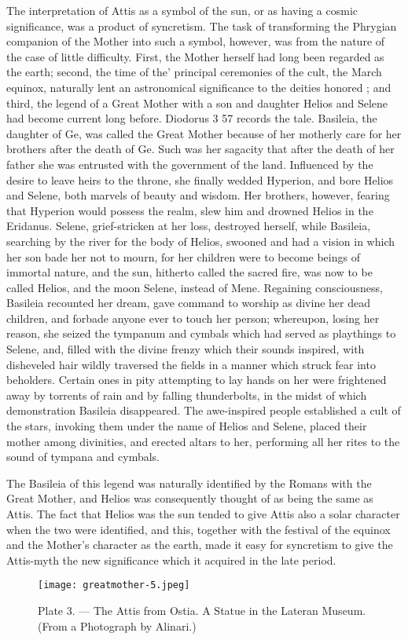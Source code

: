 \documentclass[a4paper, 11pt, oneside, polutonikogreek, english]{article}
\begin{document}
The interpretation of Attis as a symbol of the sun, or as having a cosmic significance, was a product of syncretism. The task of transforming the Phrygian companion of the Mother into such a symbol, however, was from the nature of the case of little difficulty. First, the Mother herself had long been regarded as the earth; second, the time of the' principal ceremonies of the cult, the March equinox, naturally lent an astronomical significance to the deities honored ; and third, the legend of a Great Mother with a son and daughter Helios and Selene had become current long before. Diodorus 3 57 records the tale. Basileia, the daughter of Ge, was called the Great Mother because of her motherly care for her brothers after the death of Ge. Such was her sagacity that after the death of her father she was entrusted with the government of the land. Influenced by the desire to leave heirs to the throne, she finally wedded Hyperion, and bore Helios and Selene, both marvels of beauty and wisdom. Her brothers, however, fearing that Hyperion would possess the realm, slew him and drowned Helios in the Eridanus. Selene, grief-stricken at her loss, destroyed herself, while Basileia, searching by the river for the body of Helios, swooned and had a vision in which her son bade her not to mourn, for her children were to become beings of immortal nature, and the sun, hitherto called the sacred fire, was now to be called Helios, and the moon Selene, instead of Mene. Regaining consciousness, Basileia recounted her dream, gave command to worship as divine her dead children, and forbade anyone ever to touch her person; whereupon, losing her reason, she seized the tympanum and cymbals which had served as playthings to Selene, and, filled with the divine frenzy which their sounds inspired, with disheveled hair wildly traversed the fields in a manner which struck fear into beholders. Certain ones in pity attempting to lay hands on her were frightened away by torrents of rain and by falling thunderbolts, in the midst of which demonstration Basileia disappeared. The awe-inspired people established a cult of the stars, invoking them under the name of Helios and Selene, placed their mother among divinities, and erected altars to her, performing all her rites to the sound of tympana and cymbals.

The Basileia of this legend was naturally identified by the Romans with the Great Mother, and Helios was consequently thought of as being the same as Attis. The fact that Helios was the sun tended to give Attis also a solar character when the two were identified, and this, together with the festival of the equinox and the Mother's character as the earth, made it easy for syncretism to give the Attis-myth the new significance which it acquired in the late period.
\clearpage
\begin{landscape}
\begin{figure}[H]
\centering
\texttt{[image: greatmother-5.jpeg]}
\caption{Plate 3. --- The Attis from Ostia. A Statue in the Lateran Museum. (From a Photograph by Alinari.)}
\end{figure}
\end{landscape}
\clearpage
\end{document}

